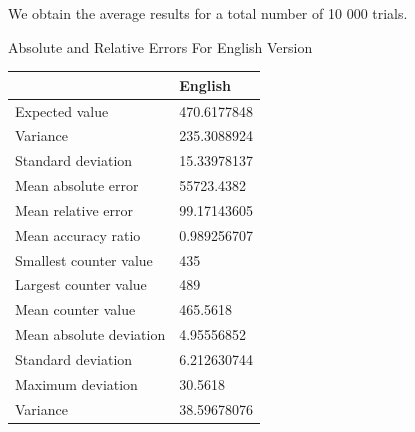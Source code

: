 \documentclass[]{revdetua}
\begin{document}
We obtain the average results for a total number of 10 000 trials.

\begin{table}[!ht]
    \centering
    Absolute and Relative Errors For English Version\linebreak\linebreak
    \begin{tabular}{|l|l|}
    \hline
        ~ & English \\ \hline
        Expected value & 470.6177848 \\ \hline
        Variance & 235.3088924 \\ \hline
        Standard deviation & 15.33978137 \\ \hline
        Mean absolute error & 55723.4382 \\ \hline
        Mean relative error & 99.17143605 \\ \hline
        Mean accuracy ratio & 0.989256707 \\ \hline
        Smallest counter value & 435 \\ \hline
        Largest counter value & 489 \\ \hline
        Mean counter value & 465.5618 \\ \hline
        Mean absolute deviation & 4.95556852 \\ \hline
        Standard deviation & 6.212630744 \\ \hline
        Maximum deviation & 30.5618 \\ \hline
        Variance & 38.59678076 \\ \hline
    \end{tabular}
\end{table}
\end{document}

